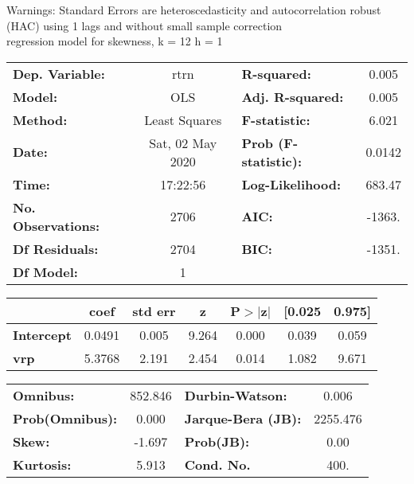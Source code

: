 Warnings: \newline
 [1] Standard Errors are heteroscedasticity and autocorrelation robust (HAC) using 1 lags and without small sample correction\\ 

regression model for skewness, k = 12 h = 1\begin{center}
\begin{tabular}{lclc}
\toprule
\textbf{Dep. Variable:}    &       rtrn       & \textbf{  R-squared:         } &     0.005   \\
\textbf{Model:}            &       OLS        & \textbf{  Adj. R-squared:    } &     0.005   \\
\textbf{Method:}           &  Least Squares   & \textbf{  F-statistic:       } &     6.021   \\
\textbf{Date:}             & Sat, 02 May 2020 & \textbf{  Prob (F-statistic):} &   0.0142    \\
\textbf{Time:}             &     17:22:56     & \textbf{  Log-Likelihood:    } &    683.47   \\
\textbf{No. Observations:} &        2706      & \textbf{  AIC:               } &    -1363.   \\
\textbf{Df Residuals:}     &        2704      & \textbf{  BIC:               } &    -1351.   \\
\textbf{Df Model:}         &           1      & \textbf{                     } &             \\
\bottomrule
\end{tabular}
\begin{tabular}{lcccccc}
                   & \textbf{coef} & \textbf{std err} & \textbf{z} & \textbf{P$> |$z$|$} & \textbf{[0.025} & \textbf{0.975]}  \\
\midrule
\textbf{Intercept} &       0.0491  &        0.005     &     9.264  &         0.000        &        0.039    &        0.059     \\
\textbf{vrp}       &       5.3768  &        2.191     &     2.454  &         0.014        &        1.082    &        9.671     \\
\bottomrule
\end{tabular}
\begin{tabular}{lclc}
\textbf{Omnibus:}       & 852.846 & \textbf{  Durbin-Watson:     } &    0.006  \\
\textbf{Prob(Omnibus):} &   0.000 & \textbf{  Jarque-Bera (JB):  } & 2255.476  \\
\textbf{Skew:}          &  -1.697 & \textbf{  Prob(JB):          } &     0.00  \\
\textbf{Kurtosis:}      &   5.913 & \textbf{  Cond. No.          } &     400.  \\
\bottomrule
\end{tabular}
\end{center}

